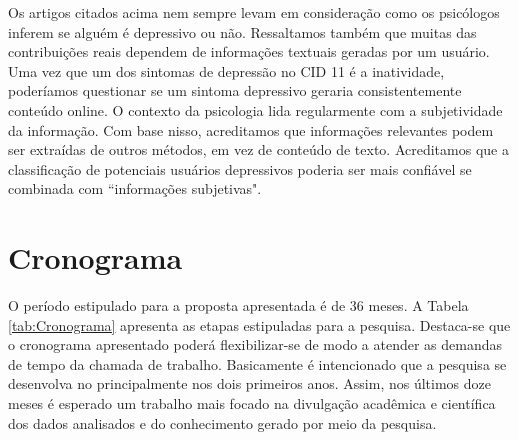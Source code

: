 \documentclass[11pt, notitlepage]{article} %
\begin{document}
Os artigos citados acima nem sempre levam em consideração como os psicólogos inferem se alguém é depressivo ou não.
Ressaltamos também que muitas das contribuições reais dependem de informações textuais geradas por um usuário. Uma vez que um dos sintomas de depressão no CID 11 é a inatividade, poderíamos questionar se um sintoma depressivo geraria consistentemente conteúdo online. O contexto da psicologia lida regularmente com a subjetividade da informação. Com base nisso, acreditamos que informações relevantes podem ser extraídas de outros métodos, em vez de conteúdo de texto. Acreditamos que a classificação de potenciais usuários depressivos poderia ser mais confiável se combinada com ``informações subjetivas".

\section*{Cronograma}
O período estipulado para a proposta apresentada é de 36 meses. A Tabela \ref{tab:Cronograma} apresenta as etapas estipuladas para a pesquisa. Destaca-se que o cronograma apresentado poderá flexibilizar-se de modo a atender as demandas de tempo da chamada de trabalho. Basicamente é intencionado que a pesquisa se desenvolva no principalmente nos dois primeiros anos. Assim, nos últimos doze meses é esperado um trabalho mais focado na divulgação acadêmica e científica dos dados analisados e do conhecimento gerado por meio da pesquisa.
\end{document}

